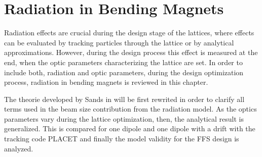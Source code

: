 \chapter{Radiation in Bending Magnets}\label{bendrad}
Radiation effects are crucial during the design stage of the lattices, where effects can be evaluated by tracking particles through the lattice or by analytical approximations. However, during the design process this effect is measured at the end, when the optic parameters characterizing the lattice are set. In order to include both, radiation and optic parameters, during the design optimization process, radiation in bending magnets is reviewed in this chapter.\par
The theorie developed by Sands in \cite{Sands} will be first rewrited in order to clarify all terms used in the beam size contribution from the radiation model. As the optics parameters vary during the lattice optimization, then, the analytical result is generalized. This is compared for one dipole and one dipole with a drift  with the tracking code PLACET \cite{Placet} and finally the model validity for the FFS design is analyzed.

